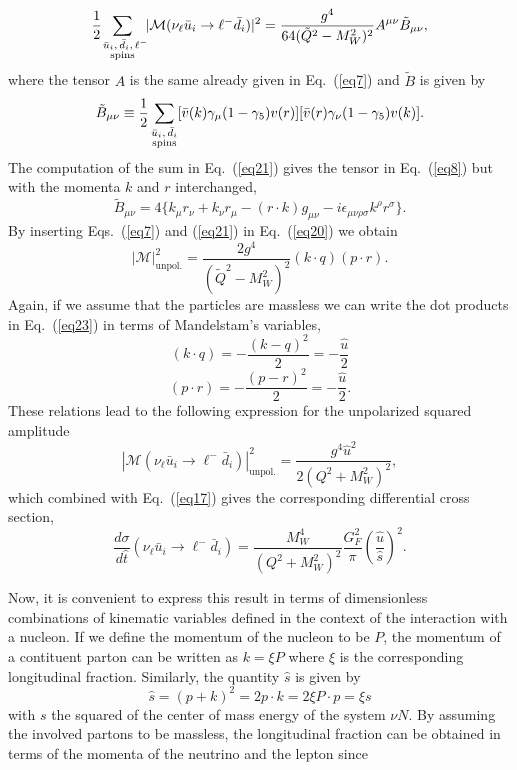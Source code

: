 \documentclass[aps,preprint,tightenlines,floatfix,superscriptaddress,nofootinbib,showpacs]{revtex4-1}
\def\beq{\begin{equation}}
\def\eeq{\end{equation}}
\begin{document}
\beq
\label{eq20}
\frac{1}{2}\!\!\!\sum_{\substack{\,\,\,\bar{u}_i,\, \bar{d}_i,\, \ell^{-} \\ \tiny{\mathrm{spins}}}}\!\!|\mathcal{M}(\nu_{\ell}\bar{u}_i \rightarrow \ell^- \bar{d}_i)|^2=\frac{g^4}{64(\tilde{Q}^2-M^2_W)^2}A^{\mu\nu}\tilde{B}_{\mu \nu},
\eeq
where the tensor $A$ is the same already given in Eq.~(\ref{eq7}) and $\tilde{B}$ is given by
\beq
\label{eq21}
\tilde{B}_{\mu\nu}\equiv \frac{1}{2}\sum_{\substack{\bar{u}_i,\, \bar{d}_i \\ \tiny{\mathrm{spins}}}} [\bar{v}(k)\gamma_{\mu}(1-\gamma_5)v(r)][\bar{v}(r)\gamma_{\nu}(1-\gamma_5)v(k)].
\eeq
The computation of the sum in Eq.~(\ref{eq21}) gives the tensor in Eq.~(\ref{eq8}) but with the momenta $k$ and $r$ interchanged,
\beq
\label{eq22}
\tilde{B}_{\mu\nu}= 4\{k_{\mu}r_{\nu} + k_{\nu}r_{\mu} - (r\cdot k)g_{\mu\nu} - i\epsilon_{\mu\nu\rho\sigma}k^{\rho}r^{\sigma} \}.
\eeq
By inserting Eqs.~(\ref{eq7}) and (\ref{eq21}) in Eq.~(\ref{eq20}) we obtain
\beq
\label{eq23}
|\mathcal{M}|^2_{\mathrm{unpol.}}=\frac{2g^4}{(\tilde{Q}^2-M^2_W)^2}(k\cdot q)(p \cdot r).
\eeq
Again, if we assume that the particles are massless we can write the dot products in Eq.~(\ref{eq23}) in terms of Mandelstam's variables,
\beq
\label{eq24}
(k\cdot q)=-\frac{(k - q)^2}{2}= -\frac{\hat{u}}{2}
\eeq
\beq
\label{eq25}
(p\cdot r)=-\frac{(p - r)^2}{2}= -\frac{\hat{u}}{2}.
\eeq
These relations lead to the following expression for the unpolarized squared amplitude
\beq
\label{eq26}
|\mathcal{M}(\nu_{\ell}\bar{u}_i \rightarrow \ell^- \bar{d}_i)|^2_{\mathrm{unpol.}}=\frac{g^4 \hat{u}^2}{2(Q^2+M^2_W)^2},
\eeq
which combined with Eq.~(\ref{eq17}) gives the corresponding differential cross section,
\beq
\label{eq27}
\frac{d\sigma}{d\hat{t}}(\nu_{\ell}\bar{u}_i \rightarrow \ell^- \bar{d}_i)=\frac{M^4_W}{(Q^2+M^2_W)^2}\frac{G^2_F}{\pi}\left(\frac{\hat{u}}{\hat{s}}\right)^2.
\eeq
\par
Now, it is convenient to express this result in terms of dimensionless combinations of kinematic variables defined in the context of the interaction with a nucleon. If we define the momentum of the nucleon to be $P$, the momentum of a contituent parton can be written as $k=\xi P$ where $\xi$ is the corresponding longitudinal fraction. Similarly, the quantity $\hat{s}$ is given by
\beq
\label{eq28}
\hat{s}=(p+k)^2=2p\cdot k = 2\xi P\cdot p = \xi s
\eeq
with $s$ the squared of the center of mass energy of the system $\nu N$. By assuming the involved partons to be massless, the longitudinal fraction can be obtained in terms of the momenta of the neutrino and the lepton since
\end{document}
